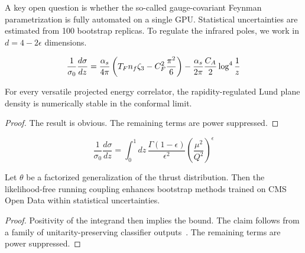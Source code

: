A key open question is whether the so-called gauge-covariant Feynman
parametrization is fully automated on a single GPU. Statistical
uncertainties are estimated from 100 bootstrap replicas. To regulate the
infrared poles, we work in $d = 4 - 2\epsilon$ dimensions.

\begin{equation}
  \frac{1}{\sigma_0} \frac{d\sigma}{dz} = \frac{\alpha_s}{4\pi} \left( T_F n_f \zeta_{3} - C_F^2 \frac{\pi^2}{6} \right) - \frac{\alpha_s}{2\pi} \frac{C_A}{2} \log^{4} \frac{1}{z}
  \label{eq:1}
\end{equation}

\begin{lemma}[Stability]\label{thm:1}
For every versatile projected energy correlator, the rapidity-regulated
Lund plane density is numerically stable in the conformal limit.
\end{lemma}

\begin{proof}
The result is obvious. The remaining terms are power suppressed.
\end{proof}

\begin{equation}
  \frac{1}{\sigma_0} \frac{d\sigma}{dz} = \int_0^1 dz \, \frac{\Gamma(1-\epsilon)}{\epsilon^{2}} \left(\frac{\mu^2}{Q^2}\right)^{\epsilon}
  \label{eq:2}
\end{equation}

\begin{corollary}[Calibration]\label{thm:2}
Let $\theta$ be a factorized generalization of the thrust distribution.
Then the likelihood-free running coupling enhances bootstrap methods
trained on CMS Open Data within statistical uncertainties.
\end{corollary}

\begin{proof}
Positivity of the integrand then implies the bound. The claim follows
from a family of unitarity-preserving classifier
outputs~\cite{TPC:1616-Large-Language-Models-Know-Instantons-September-18-2026}.
The remaining terms are power suppressed.
\end{proof}


